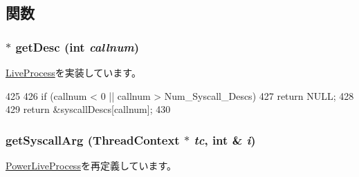 \subsection{関数}
\hypertarget{classPowerLinuxProcess_aebbff609a7235342925445690acf5ee8}{
\subsubsection[{getDesc}]{ $\ast$ getDesc (int {\em callnum})}}
\label{classPowerLinuxProcess_aebbff609a7235342925445690acf5ee8}


\hyperlink{classLiveProcess_a478f396f8895ef7728d26866a00121d7}{LiveProcess}を実装しています。


\begin{DoxyCode}
425 {
426     if (callnum < 0 || callnum > Num_Syscall_Descs)
427         return NULL;
428 
429     return &syscallDescs[callnum];
430 }
\end{DoxyCode}
\hypertarget{classPowerLinuxProcess_a4a1521e60b3fd8333fc98a5565c484ec}{
\subsubsection[{getSyscallArg}]{ getSyscallArg ({\bf ThreadContext} $\ast$ {\em tc}, \/  int \& {\em i})}}
\label{classPowerLinuxProcess_a4a1521e60b3fd8333fc98a5565c484ec}


\hyperlink{classPowerLiveProcess_a4a1521e60b3fd8333fc98a5565c484ec}{PowerLiveProcess}を再定義しています。


